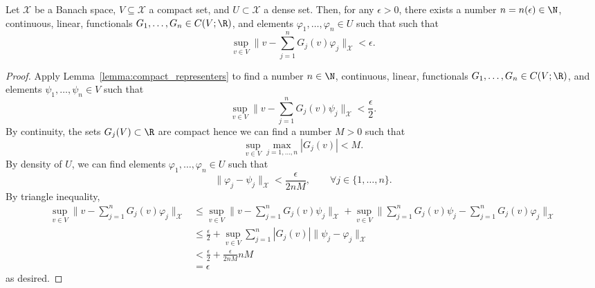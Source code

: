 {\begin{lemma}
\label{lemma:compact_representers_dense}
Let \(\mathcal{X}\) be a Banach space, \(V \subseteq \mathcal{X}\) a compact set, and \(U \subset \mathcal{X}\) a dense set. Then, for any 
\(\epsilon > 0\), there exists a number \(n = n(\epsilon) \in \N\), continuous, linear, functionals \(G_1, \dots, G_n \in C(V;\R)\),
and elements \(\varphi_1,\dots,\varphi_n \in U\) such that
such that
\[\sup_{v \in V} \Big\|v - \sum_{j=1}^n G_j(v) \varphi_j \Big\|_{\mathcal{X}} < \epsilon.\]
\end{lemma}
\begin{proof}
Apply Lemma~\ref{lemma:compact_representers} to find a number \(n \in \N\), continuous, linear, functionals \(G_1, \dots, G_n \in C(V;\R)\),
and elements \(\psi_1,\dots,\psi_n \in V\) such that
\[\sup_{v \in V} \Big\|v - \sum_{j=1}^n G_j(v) \psi_j \Big\|_{\mathcal{X}} < \frac{\epsilon}{2}.\]
By continuity, the sets \(G_j(V) \subset \R\) are compact hence we can find a number \(M > 0\) such that
\[\sup_{v \in V} \max_{j=1,\dots,n} |G_j(v)| < M.\]
By density of \(U\), we can find elements \(\varphi_1,\dots,\varphi_n \in U\)
such that
\[\|\varphi_j - \psi_j\|_{\mathcal{X}} < \frac{\epsilon}{2nM}, \qquad \forall j \in \{1,\dots,n\}.\]
By triangle inequality,
\begin{align*}
    \sup_{v \in V} \Big\|v - \sum_{j=1}^n G_j(v) \varphi_j \Big\|_{\mathcal{X}} &\leq \sup_{v \in V} \Big\|v - \sum_{j=1}^n G_j(v) \psi_j \Big\|_{\mathcal{X}} + \sup_{v \in V} \Big\|\sum_{j=1}^n G_j(v) \psi_j - \sum_{j=1}^n G_j(v) \varphi_j \Big\|_{\mathcal{X}} \\
    &\leq \frac{\epsilon}{2} + \sup_{v \in V} \sum_{j=1}^n |G_j(v)| \|\psi_j - \varphi_j \|_{\mathcal{X}} \\
    &< \frac{\epsilon}{2} + \frac{\epsilon}{2nM} nM \\
    &= \epsilon
\end{align*}
as desired.
\end{proof}

}
